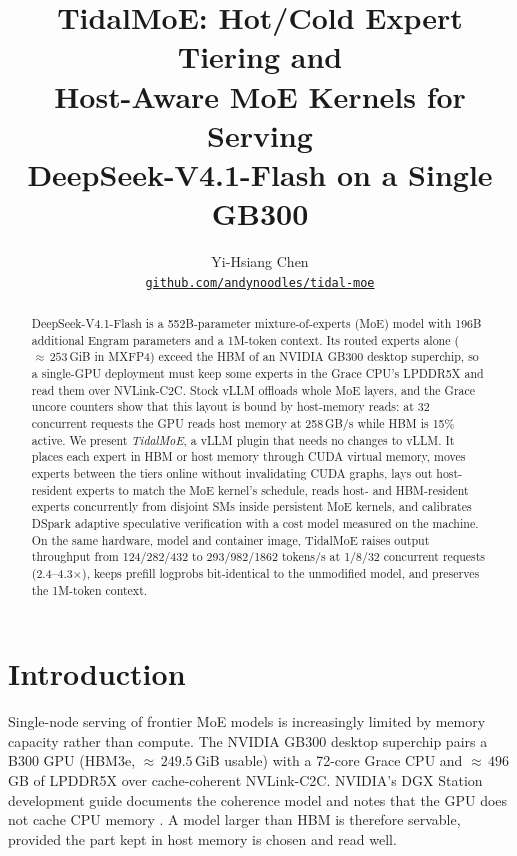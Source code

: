 \documentclass{article}
\title{TidalMoE: Hot/Cold Expert Tiering and\\ Host-Aware MoE Kernels for Serving\\ DeepSeek-V4.1-Flash on a Single GB300}
\author{Yi-Hsiang Chen \\
\normalfont\href{https://github.com/andynoodles/tidal-moe}{\texttt{github.com/andynoodles/tidal-moe}}}
\begin{document}
\maketitle
{}

\begin{abstract}
DeepSeek-V4.1-Flash is a 552B-parameter mixture-of-experts (MoE) model with 196B additional Engram parameters and a
1M-token context. Its routed experts alone (${\approx}\,253$\,GiB in MXFP4) exceed the HBM of an NVIDIA GB300 desktop
superchip, so a single-GPU deployment must keep some experts in the Grace CPU's LPDDR5X and read them over
NVLink-C2C. Stock vLLM offloads whole MoE layers, and the Grace uncore counters show that this layout is bound by
host-memory reads: at 32 concurrent requests the GPU reads host memory at 258\,GB/s while HBM is 15\% active. We
present \emph{TidalMoE}, a vLLM plugin that needs no changes to vLLM. It places each expert in HBM or host memory
through CUDA virtual memory, moves experts between the tiers online without invalidating CUDA graphs, lays out
host-resident experts to match the MoE kernel's schedule, reads host- and HBM-resident experts concurrently from
disjoint SMs inside persistent MoE kernels, and calibrates DSpark adaptive speculative verification with a cost model
measured on the machine. On the same hardware, model and container image, TidalMoE raises output throughput from
124/282/432 to 293/982/1862 tokens/s at 1/8/32 concurrent requests (2.4--4.3$\times$), keeps prefill logprobs
bit-identical to the unmodified model, and preserves the 1M-token context.
\end{abstract}

\section{Introduction}

Single-node serving of frontier MoE models is increasingly limited by memory capacity rather than compute. The NVIDIA
GB300 desktop superchip pairs a B300 GPU (HBM3e, ${\approx}\,249.5$\,GiB usable) with a 72-core Grace CPU and
${\approx}\,496$\,GB of LPDDR5X over cache-coherent NVLink-C2C. NVIDIA's DGX Station development guide documents the
coherence model and notes that the GPU does not cache CPU memory \citep{dgxstationguide}. A model larger than HBM is
therefore servable, provided the part kept in host memory is chosen and read well.
\end{document}

